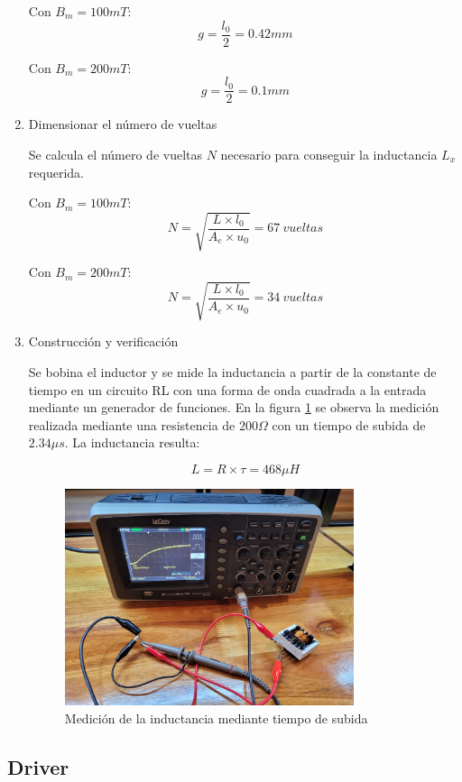 \begin{enumerate}
Con $B_m=100mT$:
$$ g=\frac{l_0}{2}=0.42mm $$

Con $B_m=200mT$:
$$ g=\frac{l_0}{2}=0.1mm $$

\item{Dimensionar el número de vueltas}

Se calcula el número de vueltas $N$ necesario para conseguir la inductancia $L_x$ requerida.

Con $B_m=100mT$:
$$ N=\sqrt{\frac{L\times l_0}{A_e\times u_0}}=67\ vueltas$$

Con $B_m=200mT$:
$$ N=\sqrt{\frac{L\times l_0}{A_e\times u_0}}=34\ vueltas $$

\item{Construcción y verificación}

Se bobina el inductor y se mide la inductancia a partir de la constante de tiempo en un circuito RL con una forma de onda cuadrada a la entrada mediante un generador de funciones. 
En la figura \ref{fig:osc-inductor-ts} se observa la medición realizada mediante una resistencia de $200\Omega$ con un tiempo de subida de $2.34\mu s$. 
La inductancia resulta:

$$ L=R\times\tau=468\mu H $$ 

\begin{figure}[ht]
    \centering
    \includegraphics[width=0.8\textwidth]{images/osc-inductor-ts.jpeg}
    \caption{Medición de la inductancia mediante tiempo de subida}
    \label{fig:osc-inductor-ts}
\end{figure}

\end{enumerate}

\subsection{Driver}

